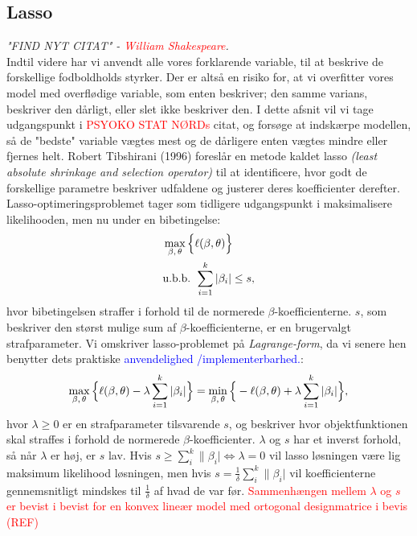 \documentclass[11pt,a4paper]{article}
\begin{document}
\subsection{Lasso}
\textit{"FIND NYT CITAT" - \textcolor{red}{William Shakespeare}.}\\
Indtil videre har vi anvendt alle vores forklarende variable, til at beskrive de forskellige fodboldholds styrker. Der er altså en risiko for, at vi overfitter vores model med overflødige variable, som enten beskriver; den samme varians, beskriver den dårligt, eller slet ikke beskriver den. I dette afsnit vil vi tage udgangspunkt i \textcolor{red}{PSYOKO STAT NØRDs} citat, og forsøge at indskærpe modellen, så de "bedste" variable vægtes mest og de dårligere enten vægtes mindre eller fjernes helt. Robert Tibshirani (1996)\cite{RobertTibshirani} foreslår en metode kaldet lasso \textit{(least absolute shrinkage and selection operator)} til at identificere, hvor godt de forskellige parametre beskriver udfaldene og justerer deres koefficienter derefter. Lasso-optimeringsproblemet tager som tidligere udgangspunkt i maksimalisere likelihooden, men nu under en bibetingelse:
\begin{align*}
&\max_{\beta,\,\theta} \Big{\{}\ell(\beta,\theta)\Big{\}} \\
&\text{u.b.b. }\sum_{i=1}^k|\beta_i|\leq s,
\end{align*}
hvor bibetingelsen straffer i forhold til de normerede $\beta$-koefficienterne. $s$, som beskriver den størst mulige sum af $\beta$-koefficienterne, er en brugervalgt strafparameter. 
Vi omskriver lasso-problemet på \textit{Lagrange-form}, da vi senere hen benytter dets praktiske \textcolor{blue}{anvendelighed /implementerbarhed.}:
\begin{align*}
\max_{\beta,\,\theta} \Big{\{}\ell(\beta,\theta)-\lambda\sum_{i=1}^k|\beta_i|\Big{\}}=\min_{\beta,\,\theta} \Big{\{}-\ell(\beta,\theta)+\lambda\sum_{i=1}^k|\beta_i|\Big{\}},
\end{align*}
hvor $\lambda\geq0$ er en strafparameter tilsvarende $s$, og beskriver hvor objektfunktionen skal straffes i forhold de normerede $\beta$-koefficienter. $\lambda$ og $s$ har et inverst forhold, så når $\lambda$ er høj, er $s$ lav. Hvis $s\geq\sum_i^k\|\beta_i|\iff \lambda=0$ vil lasso løsningen være lig maksimum likelihood løsningen, men hvis $s=\frac{1}{\delta}\sum_i^k\|\beta_i|$ vil koefficienterne gennemsnitligt mindskes til $\frac{1}{\delta}$ af hvad de var før. \textcolor{red}{Sammenhængen mellem $\lambda$ og $s$ er bevist i bevist for en konvex lineær model med ortogonal designmatrice i bevis (REF)}
\end{document}
